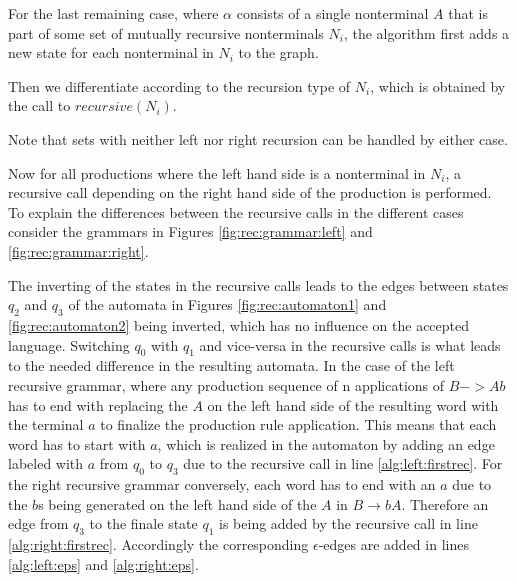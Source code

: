For the last remaining case, where $\alpha$ consists of a single nonterminal $A$ that is part of some set of mutually recursive nonterminals $N_i$, the algorithm first adds a new state for each nonterminal in $N_i$ to the graph.

Then we differentiate according to the recursion type of $N_i$, which is obtained by the call to $recursive(N_i)$.

Note that sets with neither left nor right recursion can be handled by either case.

Now for all productions where the left hand side is a nonterminal in $N_i$, a recursive call depending on the right hand side of the production is performed. 
To explain the differences between the recursive calls in the different cases consider the grammars in Figures \ref{fig:rec:grammar:left} and \ref{fig:rec:grammar:right}.

The inverting of the states in the recursive calls leads to the edges between states $q_2$ and $q_3$ of the automata in Figures \ref{fig:rec:automaton1} and \ref{fig:rec:automaton2} being inverted, which has no influence on the accepted language. Switching $q_0$ with $q_1$ and vice-versa in the recursive calls is what leads to the needed difference in the resulting automata. In the case of the left recursive grammar, where any production sequence of n applications of $B -> Ab$ has to end with replacing the $A$ on the left hand side of the resulting word with the terminal $a$ to finalize the production rule application. This means that each word has to start with $a$, which is realized in the automaton by adding an edge labeled with $a$ from $q_0$ to $q_3$ due to the recursive call in line \ref{alg:left:firstrec}. For the right recursive grammar conversely, each word has to end with an $a$ due to the $b$s being generated on the left hand side of the $A$ in $B \rightarrow bA$. Therefore an edge from $q_3$ to the finale state $q_1$ is being added by the recursive call in line \ref{alg:right:firstrec}.
Accordingly the corresponding $\epsilon$-edges are added in lines \ref{alg:left:eps} and \ref{alg:right:eps}.

